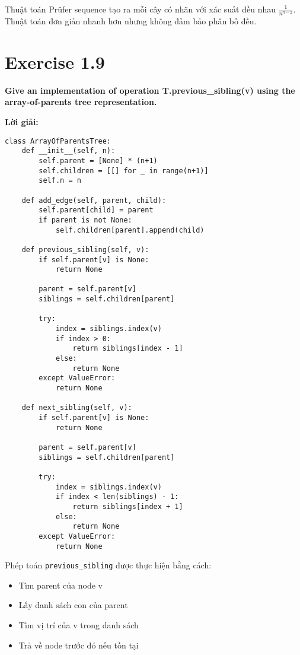 \documentclass[12pt]{article}
\begin{document}
Thuật toán Prüfer sequence tạo ra mỗi cây có nhãn với xác suất đều nhau $\frac{1}{n^{n-2}}$. Thuật toán đơn giản nhanh hơn nhưng không đảm bảo phân bố đều.

\section{Exercise 1.9}
\textbf{Give an implementation of operation T.previous\_sibling(v) using the array-of-parents tree representation.}

\textbf{Lời giải:}

\begin{lstlisting}
class ArrayOfParentsTree:
    def __init__(self, n):
        self.parent = [None] * (n+1)
        self.children = [[] for _ in range(n+1)]
        self.n = n
    
    def add_edge(self, parent, child):
        self.parent[child] = parent
        if parent is not None:
            self.children[parent].append(child)
    
    def previous_sibling(self, v):
        if self.parent[v] is None:
            return None
        
        parent = self.parent[v]
        siblings = self.children[parent]
        
        try:
            index = siblings.index(v)
            if index > 0:
                return siblings[index - 1]
            else:
                return None
        except ValueError:
            return None
    
    def next_sibling(self, v):
        if self.parent[v] is None:
            return None
        
        parent = self.parent[v]
        siblings = self.children[parent]
        
        try:
            index = siblings.index(v)
            if index < len(siblings) - 1:
                return siblings[index + 1]
            else:
                return None
        except ValueError:
            return None
\end{lstlisting}

Phép toán \texttt{previous\_sibling} được thực hiện bằng cách:
\begin{itemize}
    \item Tìm parent của node v
    \item Lấy danh sách con của parent
    \item Tìm vị trí của v trong danh sách
    \item Trả về node trước đó nếu tồn tại
\end{itemize}
\end{document}
